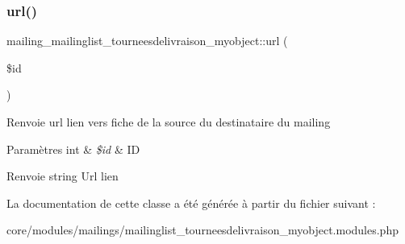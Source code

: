 \subsubsection{\texorpdfstring{url()}{url()}}
{\footnotesize\ttfamily mailing\+\_\+mailinglist\+\_\+tourneesdelivraison\+\_\+myobject\+::url (\begin{DoxyParamCaption}\item[{}]{\$id }\end{DoxyParamCaption})}

Renvoie url lien vers fiche de la source du destinataire du mailing


\begin{DoxyParams}[1]{Paramètres}
int & {\em \$id} & ID \\
\hline
\end{DoxyParams}
\begin{DoxyReturn}{Renvoie}
string Url lien 
\end{DoxyReturn}


La documentation de cette classe a été générée à partir du fichier suivant \+:\begin{DoxyCompactItemize}
\item 
core/modules/mailings/mailinglist\+\_\+tourneesdelivraison\+\_\+myobject.\+modules.\+php\end{DoxyCompactItemize}
